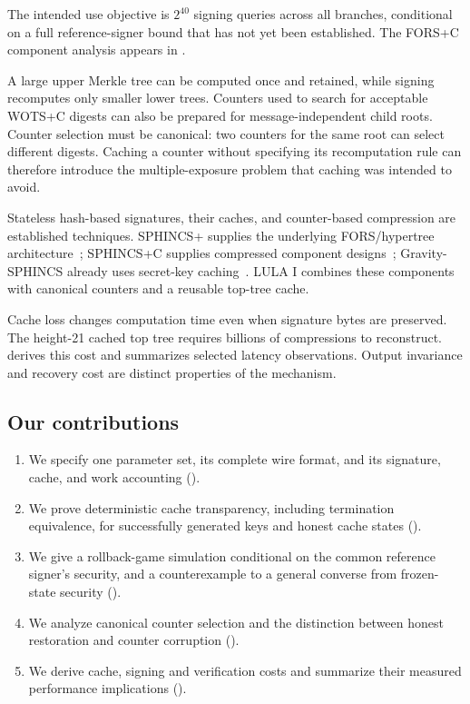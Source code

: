 \documentclass[a4paper,envcountsame,runningheads]{llncs}
\begin{document}
The intended use objective is $2^{40}$ signing queries across all branches, conditional on a full reference-signer bound that has not yet been established. The FORS+C component analysis appears in .

A large upper Merkle tree can be computed once and retained, while signing recomputes only smaller lower trees. Counters used to search for acceptable WOTS+C digests can also be prepared for message-independent child roots. Counter selection must be canonical: two counters for the same root can select different digests. Caching a counter without specifying its recomputation rule can therefore introduce the multiple-exposure problem that caching was intended to avoid.

Stateless hash-based signatures, their caches, and counter-based compression are established techniques. SPHINCS+ supplies the underlying FORS/hypertree architecture~\cite{sphincs}; SPHINCS+C supplies compressed component designs~\cite{sphincsc}; Gravity-SPHINCS already uses secret-key caching~\cite{gravity}. LULA I combines these components with canonical counters and a reusable top-tree cache.

Cache loss changes computation time even when signature bytes are preserved. The height-21 cached top tree requires billions of compressions to reconstruct.  derives this cost and summarizes selected latency observations. Output invariance and recovery cost are distinct properties of the mechanism.

\subsection{Our contributions}\label{sec:scope}

\begin{enumerate}
\item We specify one parameter set, its complete wire format, and its signature, cache, and work accounting ().
\item We prove deterministic cache transparency, including termination equivalence, for successfully generated keys and honest cache states ().
\item We give a rollback-game simulation conditional on the common reference signer's security, and a counterexample to a general converse from frozen-state security ().
\item We analyze canonical counter selection and the distinction between honest restoration and counter corruption ().
\item We derive cache, signing and verification costs and summarize their measured performance implications ().
\end{enumerate}
\end{document}
